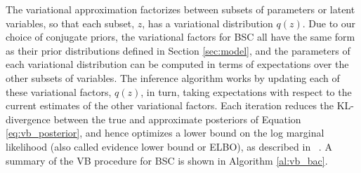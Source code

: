 The variational approximation factorizes between subsets of parameters or latent variables, so that each subset, $z$, has a variational distribution $q(z)$. 
Due to our choice of conjugate priors, the variational factors for BSC all have
the same form as their prior distributions defined in Section \ref{sec:model},
and the parameters of each variational distribution can be computed in terms  of 
expectations over the other subsets of variables.
The inference algorithm works by updating each of these variational factors, $q(z)$, 
in turn,
taking expectations with respect to the current estimates of the other variational factors.
Each iteration reduces the KL-divergence between the true and approximate posteriors
of Equation \ref{eq:vb_posterior}, and hence optimizes a lower bound on the 
log marginal likelihood (also called evidence lower bound or ELBO), as described in
~\cite{bishop_pattern_2007,attias_advances_2000}.
A summary of the VB procedure for BSC is shown in Algorithm \ref{al:vb_bac}.

